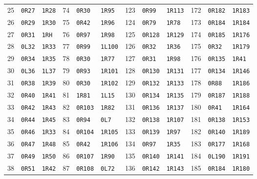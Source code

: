 \begin{center}
\begin{tabular}{rll@{\qquad}rll@{\qquad}rll@{\qquad}rll}
25 & \texttt{0R27} & \texttt{1R28} & 74 & \texttt{0R30} & \texttt{1R95} & 123 & \texttt{0R99} & \texttt{1R113} & 172 & \texttt{0R182} & \texttt{1R183}\\
26 & \texttt{0R29} & \texttt{1R30} & 75 & \texttt{0R42} & \texttt{1R96} & 124 & \texttt{0R79} & \texttt{1R78} & 173 & \texttt{0R184} & \texttt{1R184}\\
27 & \texttt{0R31} & \texttt{1RH} & 76 & \texttt{0R97} & \texttt{1R98} & 125 & \texttt{0R128} & \texttt{1R129} & 174 & \texttt{0R185} & \texttt{1R176}\\
28 & \texttt{0L32} & \texttt{1R33} & 77 & \texttt{0R99} & \texttt{1L100} & 126 & \texttt{0R32} & \texttt{1R36} & 175 & \texttt{0R32} & \texttt{1R179}\\
29 & \texttt{0R34} & \texttt{1R35} & 78 & \texttt{0R30} & \texttt{1R77} & 127 & \texttt{0R31} & \texttt{1R98} & 176 & \texttt{0R135} & \texttt{1R41}\\
30 & \texttt{0L36} & \texttt{1L37} & 79 & \texttt{0R93} & \texttt{1R101} & 128 & \texttt{0R130} & \texttt{1R131} & 177 & \texttt{0R134} & \texttt{1R146}\\
31 & \texttt{0R38} & \texttt{1R39} & 80 & \texttt{0R30} & \texttt{1R102} & 129 & \texttt{0R132} & \texttt{1R133} & 178 & \texttt{0R88} & \texttt{1R186}\\
32 & \texttt{0R40} & \texttt{1R41} & 81 & \texttt{1R81} & \texttt{1L15} & 130 & \texttt{0R134} & \texttt{1R135} & 179 & \texttt{0R187} & \texttt{1R188}\\
33 & \texttt{0R42} & \texttt{1R43} & 82 & \texttt{0R103} & \texttt{1R82} & 131 & \texttt{0R136} & \texttt{1R137} & 180 & \texttt{0R41} & \texttt{1R164}\\
34 & \texttt{0R44} & \texttt{1R45} & 83 & \texttt{0R94} & \texttt{0L7} & 132 & \texttt{0R138} & \texttt{1R107} & 181 & \texttt{0R138} & \texttt{1R153}\\
35 & \texttt{0R46} & \texttt{1R33} & 84 & \texttt{0R104} & \texttt{1R105} & 133 & \texttt{0R139} & \texttt{1R97} & 182 & \texttt{0R140} & \texttt{1R189}\\
36 & \texttt{0R47} & \texttt{1R48} & 85 & \texttt{0R42} & \texttt{1R106} & 134 & \texttt{0R97} & \texttt{1R35} & 183 & \texttt{0R177} & \texttt{1R168}\\
37 & \texttt{0R49} & \texttt{1R50} & 86 & \texttt{0R107} & \texttt{1R90} & 135 & \texttt{0R140} & \texttt{1R141} & 184 & \texttt{0L190} & \texttt{1R191}\\
38 & \texttt{0R51} & \texttt{1R42} & 87 & \texttt{0R108} & \texttt{0L72} & 136 & \texttt{0R142} & \texttt{1R143} & 185 & \texttt{0R184} & \texttt{1R180}\\

\end{tabular}
\end{center}

